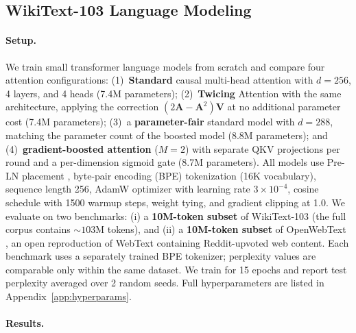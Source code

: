 \documentclass{article}
\theoremstyle{definition}
\begin{document}
\subsection{WikiText-103 Language Modeling}

\paragraph{Setup.}
We train small transformer language models from scratch and compare four attention configurations: (1)~\textbf{Standard} causal multi-head attention with $d = 256$, 4 layers, and 4 heads (7.4M parameters); (2)~\textbf{Twicing} Attention \citep{abdullaev2025twicing} with the same architecture, applying the correction $(2\mathbf{A} - \mathbf{A}^2)\mathbf{V}$ at no additional parameter cost (7.4M parameters); (3)~a \textbf{parameter-fair} standard model with $d = 288$, matching the parameter count of the boosted model (8.8M parameters); and (4)~\textbf{gradient-boosted attention} ($M = 2$) with separate QKV projections per round and a per-dimension sigmoid gate (8.7M parameters).
All models use Pre-LN placement \citep{xiong2020layer}, byte-pair encoding (BPE) tokenization (16K vocabulary), sequence length 256, AdamW optimizer with learning rate $3 \times 10^{-4}$, cosine schedule with 1500 warmup steps, weight tying, and gradient clipping at 1.0.
We evaluate on two benchmarks: (i) a \textbf{10M-token subset} of WikiText-103 \citep{merity2016pointer} (the full corpus contains ${\sim}103$M tokens), and (ii) a \textbf{10M-token subset} of OpenWebText \citep{gokaslan2019openwebtext}, an open reproduction of WebText containing Reddit-upvoted web content.
Each benchmark uses a separately trained BPE tokenizer; perplexity values are comparable only within the same dataset.
We train for 15 epochs and report test perplexity averaged over 2 random seeds.
Full hyperparameters are listed in Appendix~\ref{app:hyperparams}.

\paragraph{Results.}
\end{document}
